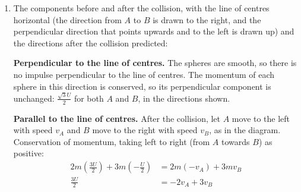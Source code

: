 \documentclass[leqno]{article}
\begin{document}
\begin{enumerate}[
  label=\textbf{\arabic*.},
  leftmargin=*,
  topsep=0pt,
  partopsep=0pt,
  parsep=0pt
]
\begin{djsSolution}
\begin{enumerate}[label=\textbf{(\alph*)}, start=1]
\item
The components before and after the collision, with the line of centres horizontal (the direction from \(A\) to \(B\) is drawn to the right, and the perpendicular direction that points upwards and to the left is drawn up) and the directions after the collision predicted:\par\nopagebreak


\textbf{Perpendicular to the line of centres.} The spheres are smooth, so there is no impulse perpendicular to the line of centres. The momentum of each sphere in this direction is conserved, so its perpendicular component is unchanged: \(\frac{\sqrt3U}{2}\) for both \(A\) and \(B\), in the directions shown.

\textbf{Parallel to the line of centres.} After the collision, let \(A\) move to the left with speed \(v_A\) and \(B\) move to the right with speed \(v_B\), as in the diagram. Conservation of momentum, taking left to right (from \(A\) towards \(B\)) as positive:
\begin{align*}
2m\left(\frac{3U}{2}\right)+3m\left(-\frac{U}{2}\right)&=2m(-v_A)+3mv_B\\
\frac{3U}{2}&=-2v_A+3v_B
\end{align*}


\end{enumerate}
\end{djsSolution}
\end{enumerate}
\end{document}
